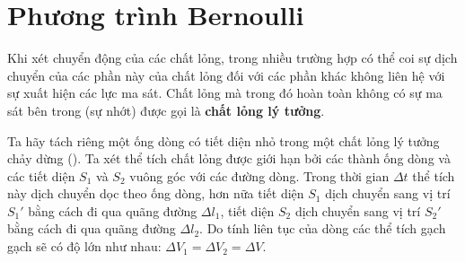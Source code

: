 
\section{Phương trình Bernoulli}\label{sec:9_2}


Khi xét chuyển động của các chất lỏng, trong nhiều trường hợp có thể coi sự dịch chuyển của các phần này của chất lỏng đối với các phần khác không liên hệ với sự xuất hiện các lực ma sát. Chất lỏng mà trong đó hoàn toàn không có sự ma sát bên trong (sự nhớt) được gọi là \textbf{chất lỏng lý tưởng}.


Ta hãy tách riêng một ống dòng có tiết diện nhỏ trong một chất lỏng lý tưởng chảy dừng (). Ta xét thể tích chất lỏng được giới hạn bởi các thành ống dòng và các tiết diện $S_1$ và $S_2$ vuông góc với các đường dòng. Trong thời gian $\Delta t$ thể tích này dịch chuyển dọc theo ống dòng, hơn nữa tiết diện $S_1$ dịch chuyển sang vị trí $S_1'$ bằng cách đi qua quãng đường $\Delta l_1$, tiết diện $S_2$ dịch chuyển sang vị trí $S_2'$ bằng cách đi qua quãng đường $\Delta l_2$. Do tính liên tục của dòng các thể tích gạch gạch sẽ có độ lớn như nhau: $\Delta V_1 = \Delta V_2 = \Delta V$.

